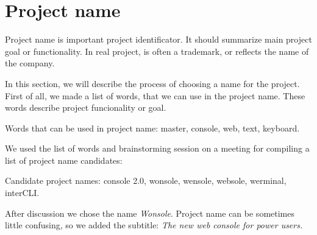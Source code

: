 \section{Project name}
Project name is important project identificator. It should summarize main project goal or functionality. In real project, is often a trademark, or reflects the name of the company.

In this section, we will describe the process of choosing a name for the project. First of all, we made a list of words, that we can use in the project name. These words describe project funcionality or goal.

Words that can be used in project name: master, console, web, text, keyboard.

We used the list of words and brainstorming session on a meeting for compiling a list of project name candidates:

Candidate project names: console 2.0, wonsole, wensole, websole, werminal, interCLI.

After discussion we chose the name \emph{Wonsole}. Project name can be sometimes little confusing, so we added the subtitle: \emph{The new web console for power users.}
